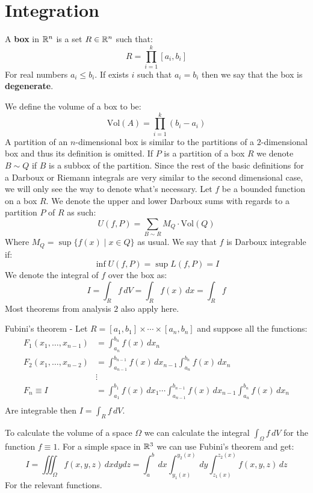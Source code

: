 \documentclass[11pt,a4paper]{article}
\begin{document}
\section{Integration}
\begin{definition}
  A \textbf{box} in $\mathbb{R}^n$ is a set $R \in \mathbb{R}^n$ such that:
  \[
    R = \prod_{i=1}^{k}{[a_i,b_i]}
  \]
  For real numbers $a_i \le b_i$. If exists $i$ such that $a_i=b_i$
  then we say that the box is \textbf{degenerate}.
\end{definition}
We define the volume of a box to be:
\[
  \mathrm{Vol}(A) = \prod_{i=1}^{k}{(b_i-a_i)}
\]
A partition of an $n$-dimensional box is similar to the partitions
of a $2$-dimensional box and thus its definition is omitted.
If $P$ is a partition of a box $R$ we denote $B \sim Q$ if
$B$ is a subbox of the partition. Since the rest of the basic
definitions for a Darboux or Riemann integrals are very similar
to the second dimensional case, we will only see the way
to denote what's necessary. Let $f$ be a bounded function on
a box $R$. We denote the upper and lower Darboux sums with
regards to a partition $P$ of $R$ as such:
\[
  U(f,P) = \sum_{B \sim R}{M_Q \cdot \mathrm{Vol}(Q)}
\]
Where $M_Q = \sup\{f(x) \mid x \in Q\}$ as usual. We say
that $f$ is Darboux integrable if:
\[
  \inf U(f,P) = \sup L(f,P) = I
\]
We denote the integral of $f$ over the box as:
\[
  I = \int_{R}{f\,dV} = 
  \int_{R}{f(x)\,dx} = \int_{R}{f}
\]
Most theorems from analysis $2$ also apply here.
\begin{definition}
  Fubini's theorem - Let 
  $R = [a_1,b_1] \times \cdots \times [a_n,b_n]$ and suppose
  all the functions:
  \begin{align*}
    F_1(x_1,\dots,x_{n-1}) &= \int_{a_n}^{b_n}{f(x)\,dx_n} \\
    F_2(x_1,\dots,x_{n-2}) 
    &= \int_{a_{n-1}}^{b_{n-1}}{f(x)\,dx_{n-1}}
    \int_{a_n}^{b_n}{f(x)\,dx_n}\\
    &\vdots \\
    F_n \equiv I &= \int_{a_{1}}^{b_{1}}{f(x)\,dx_{1}} \cdots
    \int_{a_{n-1}}^{b_{n-1}}{f(x)\,dx_{n-1}}
    \int_{a_n}^{b_n}{f(x)\,dx_n} \\
  \end{align*}
  Are integrable then $I = \int_{R}{f\,dV}$.
\end{definition}
To calculate the volume of a space $\Omega$ we can calculate
the integral $\int_{\Omega}{f\,dV}$ for the function $f \equiv 1$.
For a simple space in $\mathbb{R}^3$ we can use Fubini's theorem and get:
\[
  I = \iiint_{\Omega}{f(x,y,z)\,dxdydz}
    = \int_{a}^{b}{\,dx}
      \int_{y_1(x)}^{y_2(x)}{\,dy}
      \int_{z_1(x)}^{z_2(x)}{f(x,y,z)\,dz}
\]
For the relevant functions. \hfill
\end{document}
